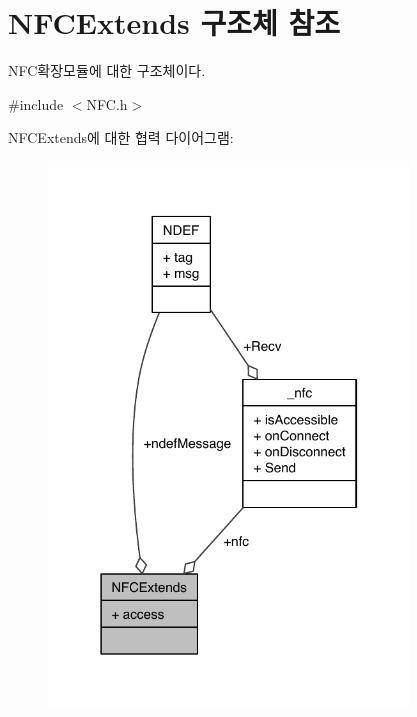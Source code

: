\hypertarget{struct_n_f_c_extends}{\section{N\-F\-C\-Extends 구조체 참조}
\label{struct_n_f_c_extends}
}


N\-F\-C확장모듈에 대한 구조체이다.  




{\ttfamily \#include $<$N\-F\-C.\-h$>$}



N\-F\-C\-Extends에 대한 협력 다이어그램\-:\nopagebreak
\begin{figure}[H]
\begin{center}
\leavevmode
\includegraphics[width=271pt]{dd/ddf/struct_n_f_c_extends__coll__graph}
\end{center}
\end{figure}
